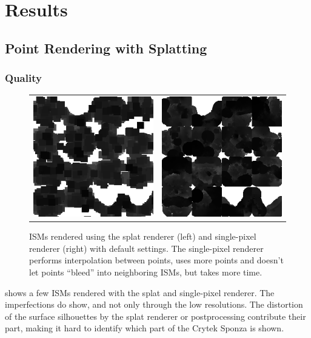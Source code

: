  \section{Results}

 \subsection{Point Rendering with Splatting}






 \subsubsection{Quality}

 \begin{figure}[htb]
 \centering
   \begin{tabular}{@{}cc@{}}
     \includegraphics[width=.22\textwidth]{../screenshots/ism_splat_cropped} &
     \includegraphics[width=.22\textwidth]{../screenshots/ism_single_pixel_cropped}
   \end{tabular}
   \caption{ISMs rendered using the splat renderer (left) and single-pixel renderer (right) with default settings. The single-pixel renderer performs interpolation between points, uses more points and doesn't let points ``bleed'' into neighboring ISMs, but takes more time.}
   \label{fig:results:isms}
 \end{figure}

  shows a few ISMs rendered with the splat and single-pixel renderer. The imperfections do show, and not only through the low resolutions. The distortion of the surface silhouettes by the splat renderer or postprocessing contribute their part, making it hard to identify which part of the Crytek Sponza is shown.

